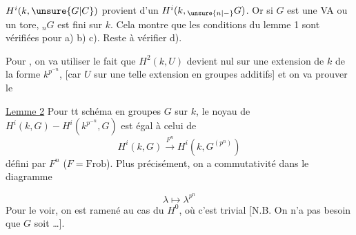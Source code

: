 $H^i(k,\unsure{G|C})$ provient d'un $H^i(k,{}_{\unsure{n|-}}G)$. Or si $G$ est une VA ou un tore, ${}_nG$ est fini sur $k$. Cela montre que les conditions du lemme 1 sont vérifiées pour a) b) c). Reste à vérifier d).

Pour , on va  utiliser  le fait que $H^2(k,U)$ devient nul sur une extension de $k$ de la forme $k^{p^{-n}}$, [car $U$  sur une telle extension en groupes additifs] et on va prouver le

\uline{Lemme 2} Pour tt schéma en groupes $G$ sur $k$, le noyau de $H^i(k,G)-H^i(k^{p^{-n}},G)$ est égal à celui de
\[
H^i(k,G)\xrightarrow{F^n}H^i(k,G^{(p^n)})
\]
défini par $F^n$ ($F=\mathrm{Frob}$). Plus précisément, on a commutativité dans le diagramme

\deleted{[N.B.}
\[
\lambda\longmapsto\lambda^{p^n}
\]
Pour le voir, on est ramené au cas du $H^0$, où c'est trivial [N.B. On n'a pas besoin que $G$ soit \ldots].

